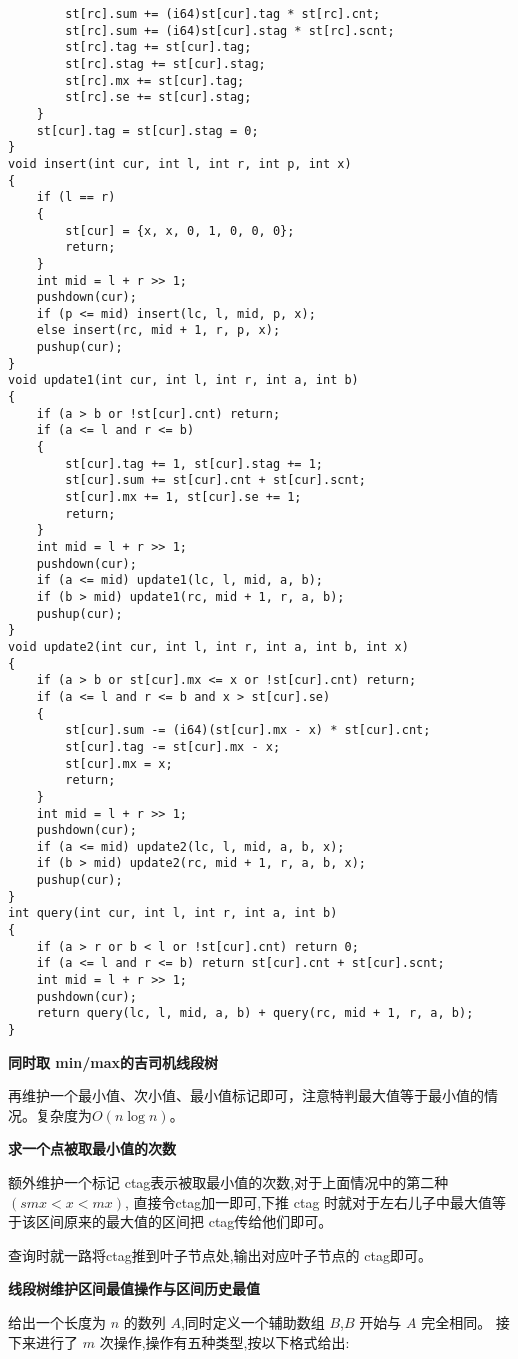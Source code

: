 \documentclass[a4paper,fontset=none]{ctexart}
\begin{document}
\begin{verbatim}
        st[rc].sum += (i64)st[cur].tag * st[rc].cnt;
        st[rc].sum += (i64)st[cur].stag * st[rc].scnt;
        st[rc].tag += st[cur].tag;
        st[rc].stag += st[cur].stag;
        st[rc].mx += st[cur].tag;
        st[rc].se += st[cur].stag;
    }
    st[cur].tag = st[cur].stag = 0;
}
void insert(int cur, int l, int r, int p, int x)
{
    if (l == r)
    {
        st[cur] = {x, x, 0, 1, 0, 0, 0};
        return;
    }
    int mid = l + r >> 1;
    pushdown(cur);
    if (p <= mid) insert(lc, l, mid, p, x);
    else insert(rc, mid + 1, r, p, x);
    pushup(cur);
}
void update1(int cur, int l, int r, int a, int b)
{
    if (a > b or !st[cur].cnt) return;
    if (a <= l and r <= b)
    {
        st[cur].tag += 1, st[cur].stag += 1;
        st[cur].sum += st[cur].cnt + st[cur].scnt;
        st[cur].mx += 1, st[cur].se += 1;
        return;
    }
    int mid = l + r >> 1;
    pushdown(cur);
    if (a <= mid) update1(lc, l, mid, a, b);
    if (b > mid) update1(rc, mid + 1, r, a, b);
    pushup(cur);
}
void update2(int cur, int l, int r, int a, int b, int x)
{
    if (a > b or st[cur].mx <= x or !st[cur].cnt) return;
    if (a <= l and r <= b and x > st[cur].se)
    {
        st[cur].sum -= (i64)(st[cur].mx - x) * st[cur].cnt;
        st[cur].tag -= st[cur].mx - x;
        st[cur].mx = x;
        return;
    }
    int mid = l + r >> 1;
    pushdown(cur);
    if (a <= mid) update2(lc, l, mid, a, b, x);
    if (b > mid) update2(rc, mid + 1, r, a, b, x);
    pushup(cur);
}
int query(int cur, int l, int r, int a, int b)
{
    if (a > r or b < l or !st[cur].cnt) return 0;
    if (a <= l and r <= b) return st[cur].cnt + st[cur].scnt;
    int mid = l + r >> 1;
    pushdown(cur);
    return query(lc, l, mid, a, b) + query(rc, mid + 1, r, a, b);
}
\end{verbatim}

\textbf{同时取 min/max的吉司机线段树}

再维护一个最小值、次小值、最小值标记即可，注意特判最大值等于最小值的情况。复杂度为$O(n\log n)$。

\textbf{求一个点被取最小值的次数}

额外维护一个标记 ctag表示被取最小值的次数,对于上面情况中的第二种$(smx<x<mx)$,
直接令ctag加一即可,下推 ctag 时就对于左右儿子中最大值等于该区间原来的最大值的区间把 
ctag传给他们即可。

查询时就一路将ctag推到叶子节点处,输出对应叶子节点的 ctag即可。

\textbf{线段树维护区间最值操作与区间历史最值}

给出一个长度为 $n$ 的数列 $A$,同时定义一个辅助数组 $B$,$B$ 开始与 $A$ 完全相同。
接下来进行了 $m$ 次操作,操作有五种类型,按以下格式给出:
\end{document}
